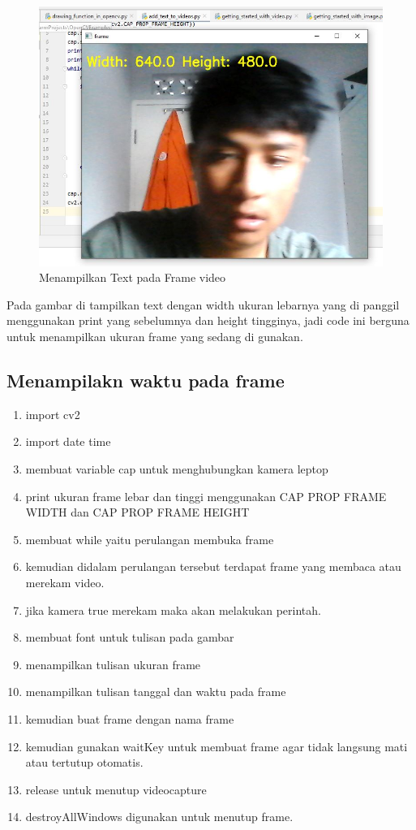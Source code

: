 \begin{figure}[ht]
\centering
\includegraphics[scale=0.6]{figures/2,17.jpg}
\caption{Menampilkan Text pada Frame video}
\label{contoh}
\end{figure}
Pada gambar di tampilkan text dengan width ukuran lebarnya yang di panggil menggunakan print yang sebelumnya dan height tingginya, jadi code ini berguna untuk menampilkan ukuran frame yang sedang di gunakan.



\newpage
\subsection{Menampilakn waktu pada frame}

\begin{enumerate}
	\item import cv2
	\item import date time
	\item membuat variable cap untuk menghubungkan kamera leptop
	\item print ukuran frame lebar dan tinggi menggunakan CAP PROP FRAME WIDTH dan CAP PROP FRAME HEIGHT
	\item membuat while yaitu perulangan membuka frame
	\item kemudian didalam perulangan tersebut terdapat frame yang membaca atau merekam video.
	\item jika kamera true merekam maka akan melakukan perintah. 
	\item membuat font untuk tulisan pada gambar
	\item menampilkan tulisan ukuran frame
	\item menampilkan tulisan tanggal dan waktu pada frame
	\item kemudian buat frame dengan nama frame
	\item kemudian gunakan waitKey untuk membuat frame agar tidak langsung mati atau tertutup otomatis.
	\item release untuk menutup videocapture
	\item destroyAllWindows digunakan untuk menutup frame.
\end{enumerate}

